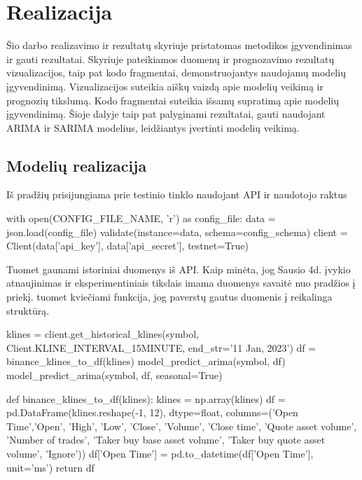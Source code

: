 \documentclass{VUMIFInfKursinis}
\begin{document}

\section{Realizacija}
Šio darbo realizavimo ir rezultatų skyriuje pristatomas metodikos įgyvendinimas ir gauti rezultatai. 
Skyriuje pateikiamos duomenų ir prognozavimo rezultatų vizualizacijos, taip pat kodo fragmentai, demonstruojantys naudojamų modelių įgyvendinimą.
Vizualizacijos suteikia aiškų vaizdą apie modelių veikimą ir prognozių tikslumą. 
Kodo fragmentai suteikia išsamų supratimą apie modelių įgyvendinimą. 
Šioje dalyje taip pat palyginami rezultatai, gauti naudojant ARIMA ir SARIMA modelius, leidžiantys įvertinti modelių veikimą.
\subsection{Modelių realizacija}

Iš pradžių prisijungiama prie testinio tinklo naudojant API ir naudotojo raktus

\begin{python}
  with open(CONFIG_FILE_NAME, 'r') as config_file:
	  data = json.load(config_file)
	  validate(instance=data, schema=config_schema)
	  client = Client(data['api_key'], data['api_secret'], testnet=True)
\end{python}

Tuomet gaunami istoriniai duomenys iš API. Kaip minėta, jog Sausio 4d. įvykio atnaujinimas ir eksperimentiniais tikslais imama duomenys savaitė nuo pradžios į priekį.
tuomet kviečiami funkcija, jog paverstų gautus duomenis į reikalinga struktūrą.

\begin{python}
  klines = client.get_historical_klines(symbol, Client.KLINE_INTERVAL_15MINUTE, end_str='11 Jan, 2023')
  df = binance_klines_to_df(klines)
  model_predict_arima(symbol, df)
  model_predict_arima(symbol, df, seasonal=True)
  
  def binance_klines_to_df(klines):
	  klines = np.array(klines)
	  df = pd.DataFrame(klines.reshape(-1, 12), dtype=float, columns=('Open Time','Open', 'High', 'Low', 'Close', 'Volume', 'Close time', 'Quote asset volume', 'Number of trades', 'Taker  buy base asset volume', 'Taker buy quote asset volume', 'Ignore'))
	  df['Open Time'] = pd.to_datetime(df['Open Time'], unit='ms')
	  return df
\end{python}
\end{document}
